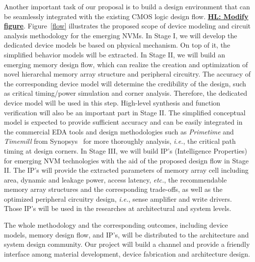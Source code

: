 Another important task of our proposal is to build a design environment that can be seamlessly integrated with the existing CMOS logic design flow. \textbf{\underline{HL: Modify figure}}. Figure~\ref{flow} illustrates the proposed scope of device modeling and circuit analysis methodology for the emerging NVMs. In Stage I, we will develop the dedicated device models be based on physical mechanism. On top of it, the simplified behavior models will be extracted. In Stage II, we will build an emerging memory design flow, which can realize the creation and optimization of novel hierarchal memory array structure and peripheral circuitry. The accuracy of the corresponding device model will determine the credibility of the design, such as critical timing/power simulation and corner analysis. Therefore, the dedicated device model will be used in this step. High-level synthesis and function verification will also be an important part in Stage II. The simplified conceptual model is expected to provide sufficient accuracy and %
can be easily integrated in the commercial EDA tools and design methodologies such as \emph{Primetime} and \emph{Timemill} from Synopsys~\cite{synopsys} for more thoroughly analysis, \emph{i.e.}, the critical path timing at design corners. In Stage III, we will build IP's (Intelligence Properties) for emerging NVM technologies with the aid of the proposed design flow in Stage II. The IP's will provide the extracted parameters of memory array cell including area, dynamic and leakage power, access latency, \emph{etc.}, the recommendable memory array structures and the corresponding trade-offs, as well as the optimized peripheral circuitry design, \emph{i.e.}, sense amplifier and write drivers. Those IP's will be used in the researches at architectural and system levels.

The whole methodology and the corresponding outcomes, including device models, memory design flow, and IP's, will be distributed to the architecture and system design community. Our project will build a channel and provide a friendly interface among material development, device fabrication and architecture design.

